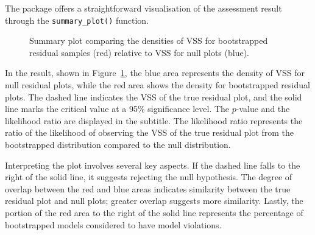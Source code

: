 \documentclass[
doublespace,
  times]{anzsauth}
\newenvironment{Shaded}{\begin{snugshade}}{\end{snugshade}}
\newcommand{\FunctionTok}[1]{\textcolor[rgb]{0.28,0.35,0.67}{#1}}
\newcommand{\NormalTok}[1]{\textcolor[rgb]{0.00,0.23,0.31}{#1}}
\newcommand{\SpecialCharTok}[1]{\textcolor[rgb]{0.37,0.37,0.37}{#1}}
\begin{document}
The package offers a straightforward visualisation of the assessment
result through the \texttt{summary\_plot()} function.

\begin{Shaded}
\end{Shaded}

\begin{figure}[H]


\caption{\label{fig-summary-plot}Summary plot comparing the densities of
VSS for bootstrapped residual samples (red) relative to VSS for null
plots (blue).}

\end{figure}%

In the result, shown in Figure~\ref{fig-summary-plot}, the blue area
represents the density of VSS for null residual plots, while the red
area shows the density for bootstrapped residual plots. The dashed line
indicates the VSS of the true residual plot, and the solid line marks
the critical value at a 95\% significance level. The \(p\)-value and the
likelihood ratio are displayed in the subtitle. The likelihood ratio
represents the ratio of the likelihood of observing the VSS of the true
residual plot from the bootstrapped distribution compared to the null
distribution.

Interpreting the plot involves several key aspects. If the dashed line
falls to the right of the solid line, it suggests rejecting the null
hypothesis. The degree of overlap between the red and blue areas
indicates similarity between the true residual plot and null plots;
greater overlap suggests more similarity. Lastly, the portion of the red
area to the right of the solid line represents the percentage of
bootstrapped models considered to have model violations.
\end{document}
